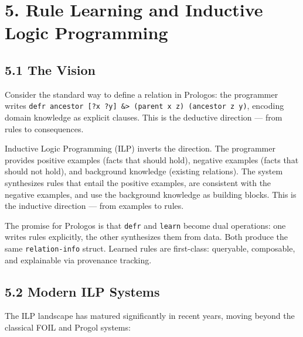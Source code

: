 \documentclass[11pt]{article}
\begin{document}
\section{5. Rule Learning and Inductive Logic Programming}
\label{sec:orgcf74255}

\subsection{5.1 The Vision}
\label{sec:org038a9a9}

Consider the standard way to define a relation in Prologos: the
programmer writes \texttt{defr ancestor [?x ?y] \&> (parent x z) (ancestor z
y)}, encoding domain knowledge as explicit clauses. This is the
deductive direction --- from rules to consequences.

Inductive Logic Programming (ILP) inverts the direction. The
programmer provides positive examples (facts that should hold),
negative examples (facts that should not hold), and background
knowledge (existing relations). The system synthesizes rules that
entail the positive examples, are consistent with the negative
examples, and use the background knowledge as building blocks. This is
the inductive direction --- from examples to rules.

The promise for Prologos is that \texttt{defr} and \texttt{learn} become dual
operations: one writes rules explicitly, the other synthesizes them
from data. Both produce the same \texttt{relation-info} struct. Learned
rules are first-class: queryable, composable, and explainable via
provenance tracking.
\subsection{5.2 Modern ILP Systems}
\label{sec:org0debcfa}

The ILP landscape has matured significantly in recent years, moving
beyond the classical FOIL and Progol systems:
\end{document}
